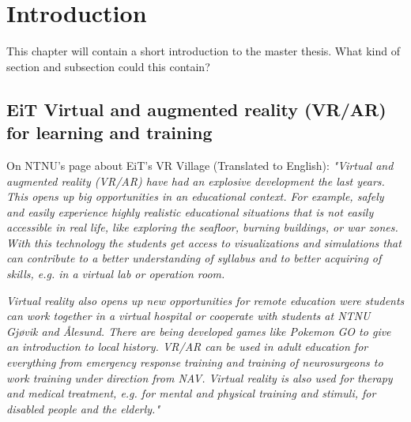 \chapter{Introduction}
This chapter will contain a short introduction to the master thesis. What kind of section and subsection could this contain?



    
    \section{EiT Virtual and augmented reality (VR/AR) for learning and training}
    
    On NTNU's page about EiT's VR Village (Translated to English):
    \emph{"Virtual and augmented reality (VR/AR) have had an explosive development the last years. This opens up big opportunities in an educational context. For example, safely and easily experience highly realistic educational situations that is not easily accessible in real life, like exploring the seafloor, burning buildings, or war zones. With this technology the students get access to visualizations and simulations that can contribute to a better understanding of syllabus and to better acquiring of skills, e.g. in a virtual lab or operation room.}
    
    \emph{Virtual reality also opens up new opportunities for remote education were students can work together in a virtual hospital or cooperate with students at NTNU Gjøvik and Ålesund. There are being developed games like Pokemon GO to give an introduction to local history. VR/AR can be used in adult education for everything from emergency response training and training of neurosurgeons to work training under direction from NAV. Virtual reality is also used for therapy and medical treatment, e.g. for mental and physical training and stimuli, for disabled people and the elderly."} \cite{EiTVRLandsby}
    
